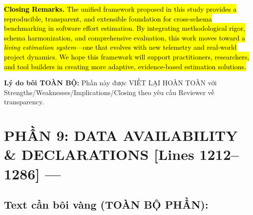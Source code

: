 \documentclass[11pt,a4paper]{article}
\begin{document}
{\begin{minipage}{\dimexpr\textwidth-2\fboxsep-2\fboxrule}
\hl{\textbf{Closing Remarks.} The unified framework proposed in this study provides a reproducible, transparent, and extensible foundation for cross-schema benchmarking in software effort estimation. By integrating methodological rigor, schema harmonization, and comprehensive evaluation, this work moves toward a \textit{living estimation system}—one that evolves with new telemetry and real-world project dynamics. We hope this framework will support practitioners, researchers, and tool builders in creating more adaptive, evidence-based estimation solutions.}
\end{minipage}}

\textbf{Lý do bôi TOÀN BỘ:} Phần này được VIẾT LẠI HOÀN TOÀN với Strengths/Weaknesses/Implications/Closing theo yêu cầu Reviewer về transparency.

\newpage
\section{PHẦN 9: DATA AVAILABILITY \& DECLARATIONS [Lines 1212--1286] --- }

\subsection*{Text cần bôi vàng (TOÀN BỘ PHẦN):}
\end{document}
